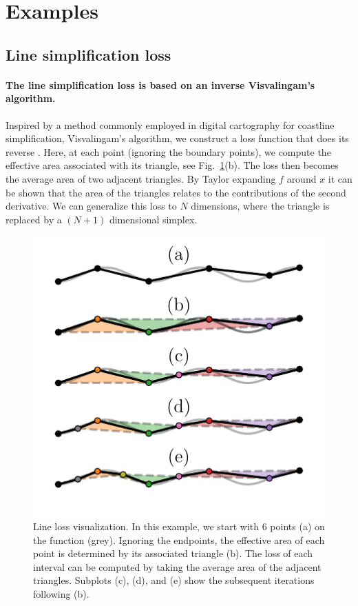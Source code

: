 \documentclass[english, twocolumn, 10pt, aps, superscriptaddress, floatfix, prb, citeautoscript]{revtex4-1}
\renewcommand{\citep}{\cite}
\begin{document}
\section{Examples}

\subsection{Line simplification loss}

\paragraph{The line simplification loss is based on an inverse Visvalingam's algorithm.}

Inspired by a method commonly employed in digital cartography for coastline simplification, Visvalingam's algorithm, we construct a loss function that does its reverse \citep{Visvalingam1990}.
Here, at each point (ignoring the boundary points), we compute the effective area associated with its triangle, see Fig.~\ref{fig:line_loss}(b).
The loss then becomes the average area of two adjacent triangles.
By Taylor expanding \(f\) around \(x\) it can be shown that the area of the triangles relates to the contributions of the second derivative.
We can generalize this loss to \(N\) dimensions, where the triangle is replaced by a \((N+1)\) dimensional simplex.

\begin{figure}
\centering
\includegraphics{figures/line_loss.pdf}
\caption{Line loss visualization.
In this example, we start with 6 points (a) on the function (grey).
Ignoring the endpoints, the effective area of each point is determined by its associated triangle (b).
The loss of each interval can be computed by taking the average area of the adjacent triangles.
Subplots (c), (d), and (e) show the subsequent iterations following (b).\label{fig:line_loss}}
\end{figure}
\end{document}
